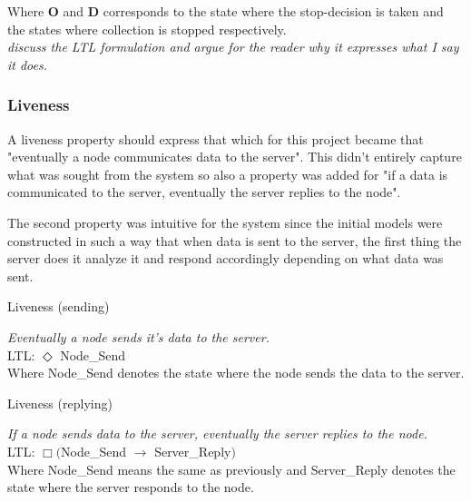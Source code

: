 Where \textbf{O} and \textbf{D} corresponds to the state where the stop-decision is taken and the states where collection is stopped respectively. \\

\textit{discuss the LTL formulation and argue for the reader why it expresses what I say it does.}

\subsubsection{Liveness}

A liveness property should express that  which for this project became that "eventually a node communicates data to the server". This didn't entirely capture what was sought from the system so also a property was added for "if a data is communicated to the server, eventually the server replies to the node". 

The second property was intuitive for the system since the initial models were constructed in such a way that when data is sent to the server, the first thing the server does it analyze it and respond accordingly depending on what data was sent.  

\begin{definition}{}{}
Liveness (sending)

\textit{Eventually a node sends it's data to the server.} \\

LTL: $\Diamond$ Node\_Send \\

Where Node\_Send denotes the state where the node sends the data to the server. \\
\end{definition} 

\begin{definition}{}{}
Liveness (replying)

\textit{If a node sends data to the server, eventually the server replies to the node.} \\

LTL: $\Box ($Node\_Send $\rightarrow$ Server\_Reply$)$ \\

Where Node\_Send means the same as previously and Server\_Reply denotes the state where the server responds to the node.
\end{definition}

